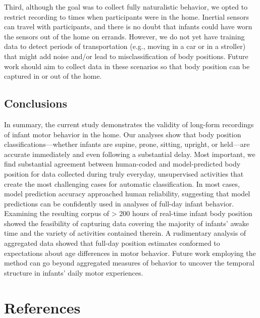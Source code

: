 \documentclass[
  man]{apa6}
\begin{document}
Third, although the goal was to collect fully naturalistic behavior, we opted to restrict recording to times when participants were in the home. Inertial sensors can travel with participants, and there is no doubt that infants could have worn the sensors out of the home on errands. However, we do not yet have training data to detect periods of transportation (e.g., moving in a car or in a stroller) that might add noise and/or lead to misclassification of body positions. Future work should aim to collect data in these scenarios so that body position can be captured in or out of the home.

\hypertarget{conclusions}{%
\subsection{Conclusions}\label{conclusions}}

In summary, the current study demonstrates the validity of long-form recordings of infant motor behavior in the home. Our analyses show that body position classifications---whether infants are supine, prone, sitting, upright, or held---are accurate immediately and even following a substantial delay. Most important, we find substantial agreement between human-coded and model-predicted body position for data collected during truly everyday, unsupervised activities that create the most challenging cases for automatic classification. In most cases, model prediction accuracy approached human reliability, suggesting that model predictions can be confidently used in analyses of full-day infant behavior. Examining the resulting corpus of \textgreater{} 200 hours of real-time infant body position showed the feasibility of capturing data covering the majority of infants' awake time and the variety of activities contained therein. A rudimentary analysis of aggregated data showed that full-day position estimates conformed to expectations about age differences in motor behavior. Future work employing the method can go beyond aggregated measures of behavior to uncover the temporal structure in infants' daily motor experiences.

\newpage

\hypertarget{references}{%
\section{References}\label{references}}
\end{document}
